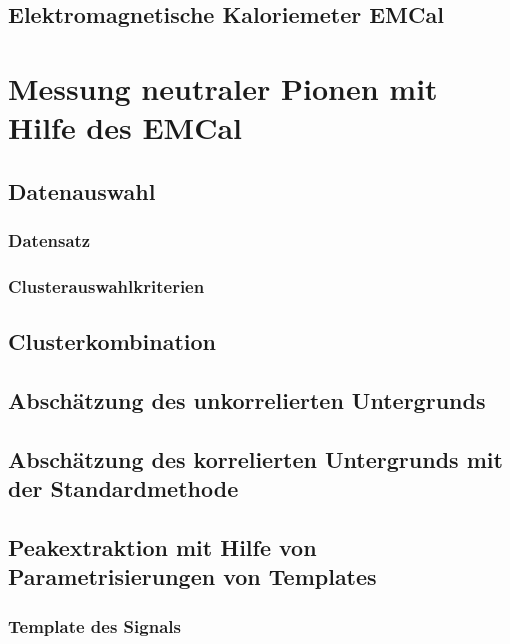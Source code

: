 \documentclass[11pt]{article}
\renewcommand{\,}{,\!} %
\begin{document}
\subsection{Elektromagnetische Kaloriemeter EMCal} \label{s2s2}

\newpage
\section{Messung neutraler Pionen mit Hilfe des EMCal} \label{s3}

\subsection{Datenauswahl} \label{s3s1}

\subsubsection{Datensatz} \label{s3s1s1}


\subsubsection{Clusterauswahlkriterien} \label{s3s1s2}


\subsection{Clusterkombination} \label{s3s2}

\subsection{Absch{\"a}tzung des unkorrelierten Untergrunds} \label{s3s3}

\subsection{Absch{\"a}tzung des korrelierten Untergrunds mit der Standardmethode} \label{s3s4}


\subsection{Peakextraktion mit Hilfe von Parametrisierungen von Templates} \label{s3s5}


\subsubsection{Template des Signals} \label{s3s5s1}

\end{document}
